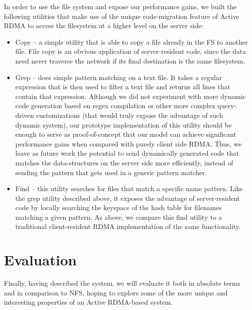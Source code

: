 \documentclass[10pt]{article}
\begin{document}
In order to use the file system and expose our performance gains, we
built the following utilities that make use of the unique
code-migration feature of Active RDMA to access the filesystem at a
higher level on the server side:

\begin{itemize}
\item Copy -- a simple utility that is able to copy a file already in
  the FS to another file. File copy is an obvious application of
  server-resident code, since the data need never traverse the network
  if its final destination is the same filesystem.

\item Grep -- does simple pattern matching on a text file. It takes a
  regular expression that is then used to filter a text file and
  returns all lines that contain that expression. Although we did not
  experiment with more dynamic code generation based on regex
  compilation or other more complex query-driven customizations (that
  would truly expose the advantage of such dynamic system), our
  prototype implementation of this utility should be enough to serve
  as proof-of-concept that our model can achieve significant
  performance gains when compared with purely client side RDMA. Thus,
  we leave as future work the potential to send dynamically generated
  code that matches the data-structures on the server side more
  efficiently, instead of sending the pattern that gets used in a
  generic pattern matcher.

\item Find -- this utility searches for files that match a specific
  name pattern. Like the grep utility described above, it exposes the
  advantage of server-resident code by locally searching the keyspace
  of the hash table for filenames matching a given pattern. As above,
  we compare this find utility to a traditional client-resident RDMA
  implementation of the same functionality.

\end{itemize}

\section{Evaluation}

Finally, having described the system, we will evaluate it both in
absolute terms and in comparison to NFS, hoping to explore some of the
more unique and interesting properties of an Active RDMA-based system.
\end{document}
